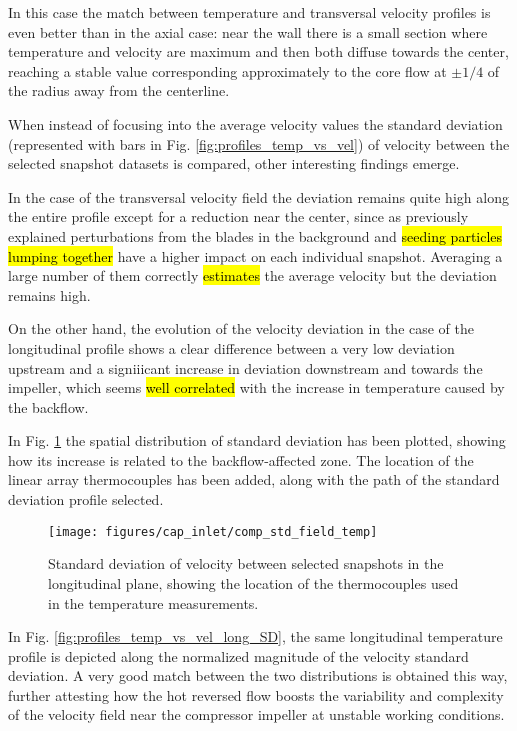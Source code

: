 In this case the match between temperature and transversal velocity profiles is even better than in the axial case: near the wall there is a small section where temperature and velocity are maximum and then both diffuse towards the center, reaching a stable value corresponding approximately to the core flow at $\pm1/4$ of the radius away from the centerline. 

When instead of focusing into the average velocity values the standard deviation (represented with bars in Fig. \ref{fig:profiles_temp_vs_vel}) of velocity between the selected snapshot datasets is compared, other interesting findings emerge.

In the case of the transversal velocity field the deviation remains quite high along the entire profile except for a reduction near the center, since as previously explained perturbations from the blades in the background and \hl{seeding particles lumping together} have a higher impact on each individual snapshot. Averaging a large number of them correctly \hl{estimates} the average velocity but the deviation remains high.

On the other hand, the evolution of the velocity deviation in the case of the longitudinal profile shows a clear difference between a very low deviation upstream and a signiiicant increase in deviation downstream and towards the impeller, which seems \hl{well correlated} with the increase in temperature caused by the backflow. 

In Fig. \ref{fig:comp_std_field_temp} the spatial distribution of standard deviation has been plotted, showing how its increase is related to the backflow-affected zone. The location of the linear array thermocouples has been added, along with the path of the standard deviation profile selected.

\begin{figure}[bht!]
\centering
\texttt{[image: figures/cap\_inlet/comp\_std\_field\_temp]}
\caption{Standard deviation of velocity between selected snapshots in the longitudinal plane, showing the location of the thermocouples used in the temperature measurements.}
\label{fig:comp_std_field_temp}
\end{figure} 

In Fig. \ref{fig:profiles_temp_vs_vel_long_SD}, the same longitudinal temperature profile is depicted along the normalized magnitude of the velocity standard deviation. A very good match between the two distributions is obtained this way, further attesting how the hot reversed flow boosts the variability and complexity of the velocity field near the compressor impeller at unstable working conditions. 

